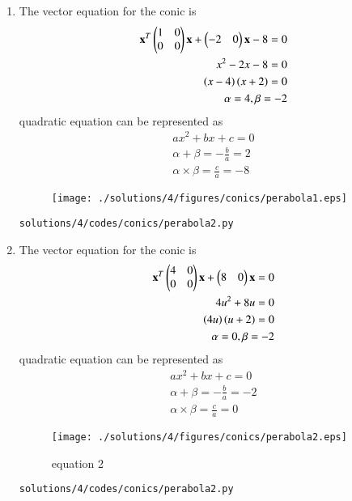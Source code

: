 \renewcommand{\theequation}{\theenumi}
\begin{enumerate}[label=\arabic*.,ref=\thesubsection.\theenumi]

\item The vector equation for the conic is
\begin{align}
\mathbf{x}^T\begin{pmatrix}1 & 0\\0 & 0\end{pmatrix}\mathbf{x} + \begin{pmatrix}-2 & 0\end{pmatrix}\mathbf{x} -8 = 0
\\
x^2-2x-8 = 0
\\
\left(x-4\right)\left(x+2\right) = 0
\\
 \alpha = 4 ,\beta =-2 
\end{align}
quadratic equation can be represented as 
\begin{align}
ax^2+bx +c = 0
\\
\alpha +\beta = -\frac{b}{a} = 2
\\
\alpha \times \beta = \frac{c}{a} = -8
\end{align}

\begin{figure}[!ht]
	\centering
	\texttt{[image: ./solutions/4/figures/conics/perabola1.eps]}
	\caption{}
	\label{fig:5.2.3_perabola1}
\end{figure}
\begin{lstlisting}
solutions/4/codes/conics/perabola2.py
\end{lstlisting}


\item The vector equation for the conic is
\begin{align}
\mathbf{x}^T\begin{pmatrix}4 & 0\\0 & 0\end{pmatrix}\mathbf{x} + \begin{pmatrix}8 & 0\end{pmatrix}\mathbf{x} = 0
\\
4u^2 + 8u = 0
\\
\left(4u\right)\left(u+2\right) = 0
\\
\alpha = 0 ,\beta =-2 
\end{align}
quadratic equation can be represented as 
\begin{align}
ax^2+bx +c = 0
\\
\alpha +\beta = -\frac{b}{a} = -2
\\
\alpha \times \beta = \frac{c}{a} = 0
\end{align}
\begin{figure}[!ht]
	\centering
	\texttt{[image: ./solutions/4/figures/conics/perabola2.eps]}
	\caption{equation 2 }
	\label{fig:5.2.3_perabola2}
\end{figure}
\begin{lstlisting}
solutions/4/codes/conics/perabola2.py
\end{lstlisting} 


\end{enumerate}
